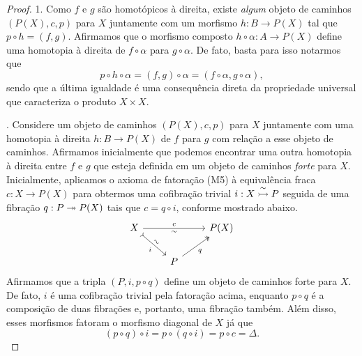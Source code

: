 
\begin{proof}
  1. Como $f$ e $g$ são homotópicos à direita, existe \emph{algum} objeto de caminhos $(P(X),c,p)$ para $X$ juntamente com um morfismo $h: B \to P(X)$ tal que $p \circ h = (f,g)$.
  Afirmamos que o morfismo composto $h \circ \alpha: A \to P(X)$ define uma homotopia à direita de $f \circ \alpha$ para $g \circ \alpha$.
  De fato, basta para isso notarmos que
  \begin{displaymath}
    p \circ h \circ \alpha = (f,g) \circ \alpha = (f \circ \alpha, g \circ \alpha),
  \end{displaymath}
  sendo que a última igualdade é uma consequência direta da propriedade universal que caracteriza o produto $X \times X$.

  . Considere um objeto de caminhos $(P(X),c,p)$ para $X$ juntamente com uma homotopia à direita $h: B \to P(X)$ de $f$ para $g$ com relação a esse objeto de caminhos.
  Afirmamos inicialmente que podemos encontrar uma outra homotopia à direita entre $f$ e $g$ que esteja definida em um objeto de caminhos \emph{forte} para $X$.
  Inicialmente, aplicamos o axioma de fatoração (M5) à equivalência fraca $c: X \to P(X)$ para obtermos uma cofibração trivial $i: X \overset{\sim}{\rightarrowtail} P$ seguida de uma fibração $q: P \twoheadrightarrow P(X)$ tais que $c = q \circ i$, conforme mostrado abaixo.
  \begin{displaymath}
    \begin{tikzcd}
      X
      \arrow[rr, "c", "\sim" {swap}]
      \arrow[rd, tail, "i" {swap}, "\sim" {sloped}]
      & & P(X)
      \\ & P
      \arrow[ru, two heads, "q" swap]
    \end{tikzcd}
  \end{displaymath}
  Afirmamos que a tripla $(P,i,p \circ q)$ define um objeto de caminhos forte para $X$.
  De fato, $i$ é uma cofibração trivial pela fatoração acima, enquanto $p \circ q$ é a composição de duas fibrações e, portanto, uma fibração também.
  Além disso, esses morfismos fatoram o morfismo diagonal de $X$ já que
  \begin{displaymath}
    (p \circ q) \circ i = p \circ (q \circ i) = p \circ c = \Delta.
  \end{displaymath}


\end{proof}
